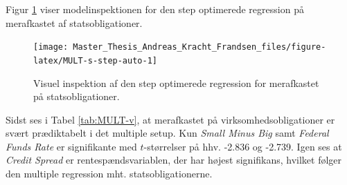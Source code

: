 \documentclass[
  a4paper,
  oneside]{memoir}
\begin{document}
Figur \ref{fig:MULT-s-step-auto} viser modelinspektionen for den step optimerede regression på merafkastet af statsobligationer.

\begin{figure}[H]

{\centering \texttt{[image: Master\_Thesis\_Andreas\_Kracht\_Frandsen\_files/figure-latex/MULT-s-step-auto-1]} 

}

\caption{Visuel inspektion af den step optimerede regression for merafkastet på statsobligationer.}\label{fig:MULT-s-step-auto}
\end{figure}

Sidst ses i Tabel \ref{tab:MULT-v}, at merafkastet på virksomhedsobligationer er svært prædiktabelt i det multiple setup. Kun \emph{Small Minus Big} samt \emph{Federal Funds Rate} er signifikante med \(t\)-størrelser på hhv. -2.836 og -2.739. Igen ses at \emph{Credit Spread} er rentespændsvariablen, der har højest signifikans, hvilket følger den multiple regression mht. statsobligationerne.
\end{document}
